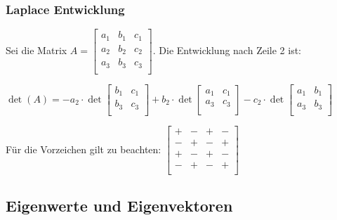 \begin{multicols*}{3}
    \begin{center}
    \end{center}


    \subsubsection{Laplace Entwicklung}

    Sei die Matrix $A = \begin{bmatrix}
            a_1 & b_1 & c_1 \\ a_2 & b_2 & c_2 \\ a_3 & b_3 & c_3 \\
        \end{bmatrix}$. Die Entwicklung nach Zeile 2 ist:

    \begin{center}
        $\det(A) = -a_2 \cdot \det\begin{bmatrix}
                b_1 & c_1 \\ b_3 & c_3 \\
            \end{bmatrix} + b_2 \cdot \det\begin{bmatrix}
                a_1 & c_1 \\ a_3 & c_3 \\
            \end{bmatrix} - c_2 \cdot \det \begin{bmatrix}
                a_1 & b_1 \\ a_3 & b_3 \\
            \end{bmatrix}$
    \end{center}

    Für die Vorzeichen gilt zu beachten: $\begin{bmatrix}
            + & - & + & - \\
            - & + & - & + \\
            + & - & + & - \\
            - & + & - & + \\
        \end{bmatrix}$


    \subsection{Eigenwerte und Eigenvektoren}


\end{multicols*}
